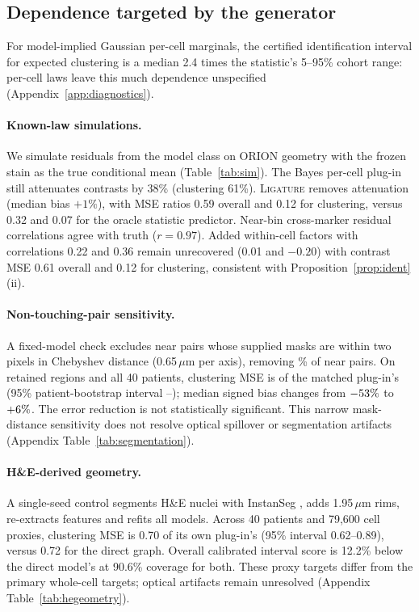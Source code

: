 \documentclass[10pt,letterpaper]{article}
\theoremstyle{definition}
\theoremstyle{remark}
\newcommand{\method}{\textnormal{\textsc{Ligature}}}
\begin{document}
\subsection{Dependence targeted by the generator}
For model-implied Gaussian per-cell marginals, the certified identification interval for expected clustering is a median 2.4 times the statistic's 5--95\% cohort range: per-cell laws leave this much dependence unspecified (Appendix~\ref{app:diagnostics}).

\paragraph{Known-law simulations.} We simulate residuals from the model class on ORION geometry with the frozen stain as the true conditional mean (Table~\ref{tab:sim}). The Bayes per-cell plug-in still attenuates contrasts by 38\% (clustering 61\%). \method{} removes attenuation (median bias $+1\%$), with MSE ratios 0.59 overall and 0.12 for clustering, versus 0.32 and 0.07 for the oracle statistic predictor. Near-bin cross-marker residual correlations agree with truth ($r=0.97$). Added within-cell factors with correlations 0.22 and 0.36 remain unrecovered (0.01 and $-0.20$) with contrast MSE 0.61 overall and 0.12 for clustering, consistent with Proposition~\ref{prop:ident}(ii).

\paragraph{Non-touching-pair sensitivity.} A fixed-model check excludes near pairs whose supplied masks are within two pixels in Chebyshev distance (0.65\,$\mu$m per axis), removing \ControlRemovedPercent\% of near pairs. On \ControlRegions{} retained regions and all 40 patients, clustering MSE is \ControlMSE{} of the matched plug-in's (95\% patient-bootstrap interval \ControlLower--\ControlUpper); median signed bias changes from $-53\%$ to $+6\%$. The error reduction is not statistically significant. This narrow mask-distance sensitivity does not resolve optical spillover or segmentation artifacts (Appendix Table~\ref{tab:segmentation}).

\paragraph{H\&E-derived geometry.} A single-seed control segments H\&E nuclei with InstanSeg \citep{instanseg2024}, adds 1.95\,$\mu$m rims, re-extracts features and refits all models. Across 40 patients and 79,600 cell proxies, clustering MSE is 0.70 of its own plug-in's (95\% interval 0.62--0.89), versus 0.72 for the direct graph. Overall calibrated interval score is 12.2\% below the direct model's at 90.6\% coverage for both. These proxy targets differ from the primary whole-cell targets; optical artifacts remain unresolved (Appendix Table~\ref{tab:hegeometry}).
\end{document}
